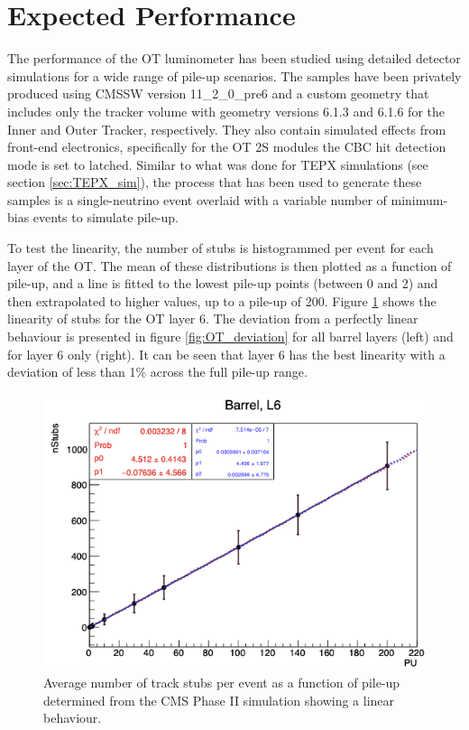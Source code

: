 \section{Expected Performance}

The performance of the OT luminometer has been studied using detailed detector simulations for a wide range of pile-up scenarios. The samples have been privately produced using CMSSW version 11\_2\_0\_pre6 and a custom geometry that includes only the tracker volume with geometry versions 6.1.3 and 6.1.6 for the Inner and Outer Tracker, respectively. They also contain simulated effects from front-end electronics, specifically for the OT 2S modules the CBC hit detection mode is set to latched. Similar to what was done for TEPX simulations (see section \ref{sec:TEPX_sim}), the process that has been used to generate these samples is a single-neutrino event overlaid with a variable number of minimum-bias events to simulate pile-up. 

To test the linearity, the number of stubs is histogrammed per event for each layer of the OT. The mean of these distributions is then plotted as a function of pile-up, and a line is fitted to the lowest pile-up points (between 0 and 2) and then extrapolated to higher values, up to a pile-up of 200. Figure \ref{fig:OT_linearity} shows the linearity of stubs for the OT layer 6. The deviation from a perfectly linear behaviour is presented in figure \ref{fig:OT_deviation} for all barrel layers (left) and for layer 6 only (right). It can be seen that layer 6 has the best linearity with a deviation of less than 1\% across the full pile-up range.

\begin{figure}[h!]
\centering
\includegraphics[width=.6\linewidth]{tex/Part2/fig/OT/OT-linearity.png}
\caption{
 Average number of track stubs per event as a function of pile-up determined from the CMS Phase II simulation showing a linear behaviour.
} 
\label{fig:OT_linearity}
\end{figure}


